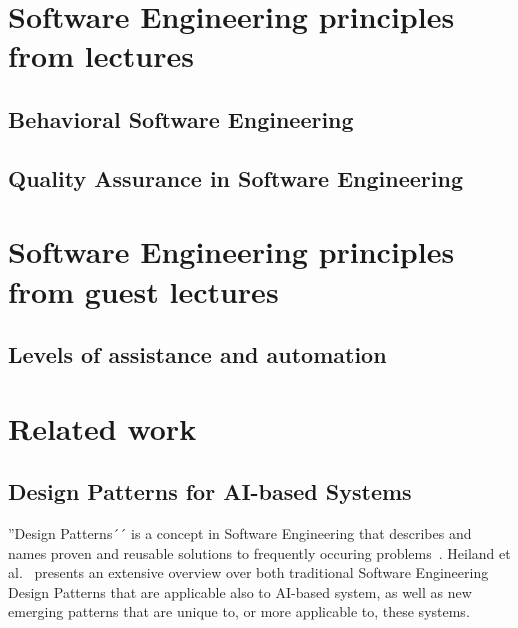 \documentclass[a4paper,twocolumn]{article}
\begin{document}
\section*{Software Engineering principles from lectures}

\subsection*{Behavioral Software Engineering}

\subsection*{Quality Assurance in Software Engineering}

\section*{Software Engineering principles from guest lectures}

\subsection*{Levels of assistance and automation}

\section*{Related work}

\subsection*{Design Patterns for AI-based Systems}

''Design Patterns´´ is a concept in Software Engineering that describes and names proven and reusable solutions to frequently occuring problems~\cite{Gamma2001}. 
Heiland et al.~\cite{heiland_design_2023} presents an extensive overview over both traditional Software Engineering Design Patterns that are applicable also to AI-based system, as well as new emerging patterns that are
unique to, or more applicable to, these systems.




\end{document}

